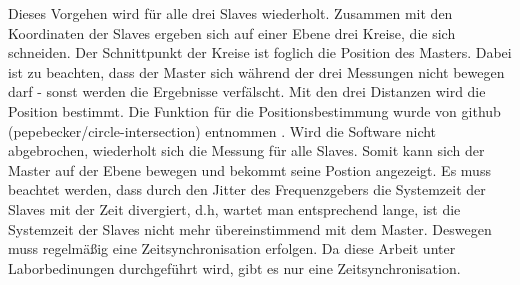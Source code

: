Dieses Vorgehen wird für alle drei Slaves wiederholt. Zusammen mit den Koordinaten der Slaves ergeben sich auf einer Ebene drei Kreise, die sich schneiden. Der Schnittpunkt der Kreise ist foglich die Position des Masters. Dabei ist zu beachten, dass der Master sich während der drei Messungen nicht bewegen darf - sonst werden die Ergebnisse verfälscht. Mit den drei Distanzen wird die Position bestimmt. Die Funktion für die Positionsbestimmung wurde von github (pepebecker/circle-intersection) entnommen \cite{src_GITHUB_CODE}. Wird die Software nicht abgebrochen, wiederholt sich die Messung für alle Slaves. Somit kann sich der Master auf der Ebene bewegen und bekommt seine Postion angezeigt. Es muss beachtet werden, dass durch den Jitter des Frequenzgebers die Systemzeit der Slaves mit der Zeit divergiert, d.h, wartet man entsprechend lange, ist die Systemzeit der Slaves nicht mehr übereinstimmend mit dem Master. Deswegen muss regelmäßig eine Zeitsynchronisation erfolgen. Da diese Arbeit unter Laborbedinungen durchgeführt wird, gibt es nur eine Zeitsynchronisation.

